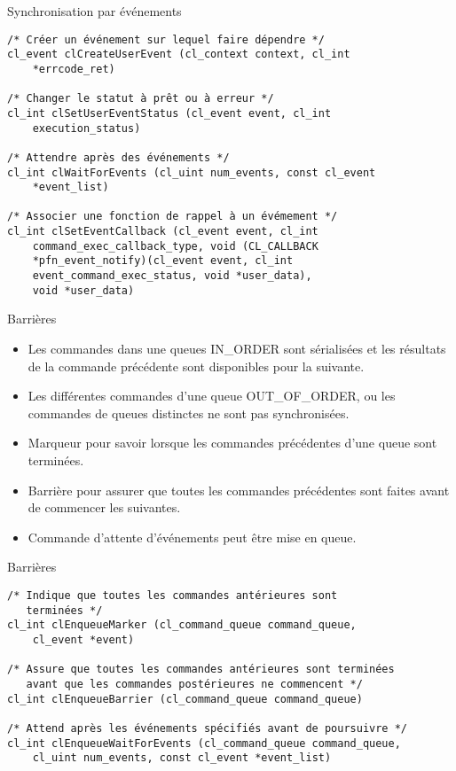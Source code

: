 \documentclass[10pt]{beamer}
\begin{document}
\begin{frame}[fragile]{Synchronisation par événements}

  \scriptsize
  \begin{verbatim}
/* Créer un événement sur lequel faire dépendre */
cl_event clCreateUserEvent (cl_context context, cl_int
    *errcode_ret)

/* Changer le statut à prêt ou à erreur */
cl_int clSetUserEventStatus (cl_event event, cl_int
    execution_status)

/* Attendre après des événements */
cl_int clWaitForEvents (cl_uint num_events, const cl_event
    *event_list)

/* Associer une fonction de rappel à un évémement */
cl_int clSetEventCallback (cl_event event, cl_int
    command_exec_callback_type, void (CL_CALLBACK 
    *pfn_event_notify)(cl_event event, cl_int
    event_command_exec_status, void *user_data),
    void *user_data)
  \end{verbatim}
\end{frame}

\begin{frame}{Barrières}

  \begin{itemize}
    \item Les commandes dans une queues IN\_ORDER sont sérialisées et les résultats de la commande précédente sont disponibles pour la suivante.

    \item Les différentes commandes d'une queue OUT\_OF\_ORDER, ou les commandes de queues distinctes ne sont pas synchronisées.

    \item Marqueur pour savoir lorsque les commandes précédentes d'une queue sont terminées.

    \item Barrière pour assurer que toutes les commandes précédentes sont faites avant de commencer les suivantes.

    \item Commande d'attente d'événements peut être mise en queue.
  \end{itemize}
\end{frame}

\begin{frame}[fragile]{Barrières}

  \scriptsize
  \begin{verbatim}
/* Indique que toutes les commandes antérieures sont 
   terminées */
cl_int clEnqueueMarker (cl_command_queue command_queue,
    cl_event *event)

/* Assure que toutes les commandes antérieures sont terminées
   avant que les commandes postérieures ne commencent */
cl_int clEnqueueBarrier (cl_command_queue command_queue)

/* Attend après les événements spécifiés avant de poursuivre */
cl_int clEnqueueWaitForEvents (cl_command_queue command_queue,
    cl_uint num_events, const cl_event *event_list)
  \end{verbatim}
\end{frame}
\end{document}
